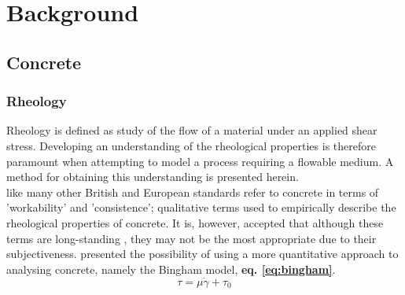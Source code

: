 
\chapter{Background}

\ifpdf
    \graphicspath{{Chapter2/Figs/Raster/}{Chapter2/Figs/PDF/}{Chapter2/Figs/}}
\else
    \graphicspath{{Chapter2/Figs/Vector/}{Chapter2/Figs/}}
\fi


\section{Concrete}
\subsection{Rheology}

Rheology is defined as study of the flow of a material under an applied shear stress. Developing an understanding of the rheological properties is therefore paramount when attempting to model a process requiring a flowable medium. A method for obtaining this understanding is presented herein.\\
\newline
\noindent
\citet{Sperwall} like many other British and European standards refer to concrete in terms of 'workability' and 'consistence'; qualitative terms used to empirically describe the rheological properties of concrete. It is, however, accepted that although these terms are long-standing \citep{Tattersall83}, they may not be the most appropriate due to their subjectiveness. \citet{Tattersall90} presented the possibility of using a more quantitative approach to analysing concrete, namely the Bingham model, {\bfseries eq. \ref{eq:bingham}}.
\begin{equation}
\tau = \mu\dot{\gamma}+\tau_0
\label{eq:bingham}
\end{equation}

